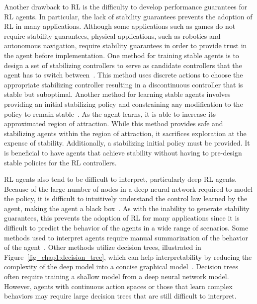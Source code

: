 Another drawback to RL is the difficulty to develop performance guarantees for RL agents.
In particular, the lack of stability guarantees prevents the adoption of RL in many applications.
Although some applications such as games do not require stability guarantees, physical applications, such as robotics and autonomous navigation, require stability guarantees in order to provide trust in the agent before implementation.
One method for training stable agents is to design a set of stabilizing controllers to serve as candidate controllers that the agent has to switch between~\cite{Perkins:2002a}. This method uses discrete actions to choose the appropriate stabilizing controller resulting in a discontinuous controller that is stable but suboptimal. Another method for learning stable agents involves providing an initial stabilizing policy and constraining any modification to the policy to remain stable~\cite{Berkenkamp:2017a}. As the agent learns, it is able to increase its approximated region of attraction. While this method provides safe and stabilizing agents within the region of attraction, it sacrifices exploration at the expense of stability. Additionally, a stabilizing initial policy must be provided. It is beneficial to have agents that achieve stability without having to pre-design stable policies for the RL controllers.


RL agents also tend to be difficult to interpret, particularly deep RL agents. Because of the large number of nodes in a deep neural network required to model the policy, it is difficult to intuitively understand the control law learned by the agent, making the agent a black box~\cite{Alharin:2020a}. As with the inability to generate stability guarantees, this prevents the adoption of RL for many applications since it is difficult to predict the behavior of the agents in a wide range of scenarios. Some methods used to interpret agents require manual summarization of the behavior of the agent~\cite{Amir:2019a,Lage:2019a}. Other methods utilize decision trees, illustrated in Figure~\ref{fig_chap1:decision_tree}, which can help interpretability by reducing the complexity of the deep model into a concise graphical model~\cite{Bastani:2018a}.
%
Decision trees often require training a shallow model from a deep neural network model. However, agents with continuous action spaces or those that learn complex behaviors may require large decision trees that are still difficult to interpret.
%

